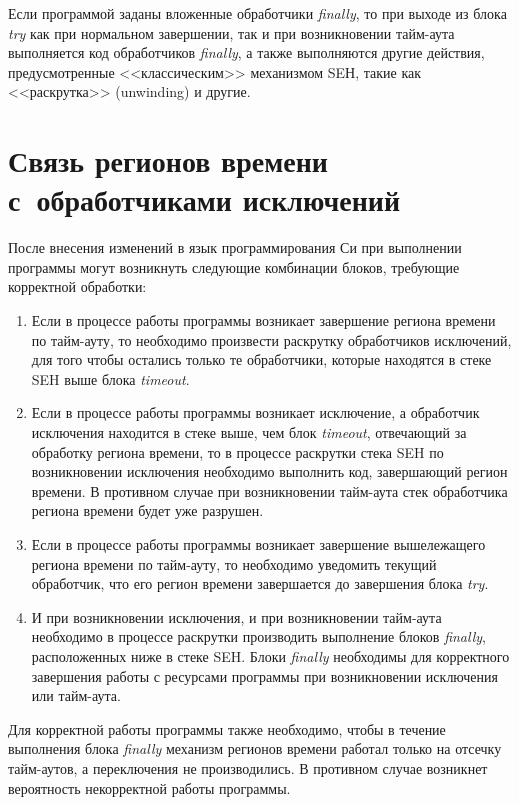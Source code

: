 \begin{multicols}{2}
     Если программой заданы вложенные обработчики \textit{finally}, то при выходе из блока \textit{try} как при
нормальном завершении, так и при возникновении тайм-аута выполняется код обработчиков
\textit{finally}, а также выполняются другие действия, предусмот\-рен\-ные <<классическим>> механизмом
SEН, такие как <<раскрутка>> (unwinding) и другие.

\section{Связь регионов времени с~обработчиками исключений}

   После внесения изменений в язык программирования Си при выполнении программы могут
возникнуть следующие комбинации блоков, тре\-бу\-ющие корректной обработки:
   \begin{enumerate}[1.]
\item Если в процессе работы программы возникает завершение региона времени по
тайм-ауту, то необходимо произвести раскрутку обработчиков исключений, для того
чтобы остались только те обработчики, которые находятся в стеке SEH выше блока
\textit{timeout}.
\item Если в процессе работы программы возникает исключение, а обработчик исключения
находится в стеке выше, чем блок \textit{timeout}, отвечающий за обработку региона времени, то в
процессе раскрутки стека SEH по возникновении исключения необходимо выполнить код,
завершающий регион времени. В противном случае при возникновении тайм-аута стек
обработчика региона времени будет уже разрушен.
\item Если в процессе работы программы возникает завершение вышележащего региона
времени по тайм-ауту, то необходимо уведомить текущий обработчик, что его регион
времени завершается до завершения блока \textit{try}.
\item И при возникновении исключения, и при возникновении тайм-аута необходимо в
процессе раскрутки производить выполнение блоков \textit{finally}, расположенных ниже в стеке
SEH. Блоки \textit{finally} необходимы для корректного завершения работы с ресурсами
программы при возникновении исключения или тайм-аута.
   \end{enumerate}

   Для корректной работы программы также необходимо, чтобы в течение выполнения блока
\textit{finally} механизм регионов времени работал только на отсечку тайм-аутов, а переключения не
производились. В противном случае возникнет вероятность некорректной работы программы.


\end{multicols}

